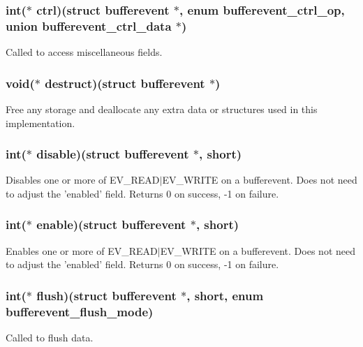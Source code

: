 \subsubsection[{ctrl}]{\setlength{\rightskip}{0pt plus 5cm}int($\ast$ {\bf ctrl})(struct {\bf bufferevent} $\ast$, enum bufferevent\-\_\-ctrl\-\_\-op, union {\bf bufferevent\-\_\-ctrl\-\_\-data} $\ast$)}\label{structbufferevent__ops_a137be51602bbde05eab1b5753e7bb727}
\-Called to access miscellaneous fields. 
\subsubsection[{destruct}]{\setlength{\rightskip}{0pt plus 5cm}void($\ast$ {\bf destruct})(struct {\bf bufferevent} $\ast$)}\label{structbufferevent__ops_a840fc11c5403abdfb2459c85d300c210}
\-Free any storage and deallocate any extra data or structures used in this implementation. 
\subsubsection[{disable}]{\setlength{\rightskip}{0pt plus 5cm}int($\ast$ {\bf disable})(struct {\bf bufferevent} $\ast$, short)}\label{structbufferevent__ops_a03f52d6bf34755e85157ebb5b80dddd3}
\-Disables one or more of \-E\-V\-\_\-\-R\-E\-A\-D$|$\-E\-V\-\_\-\-W\-R\-I\-T\-E on a bufferevent. \-Does not need to adjust the 'enabled' field. \-Returns 0 on success, -\/1 on failure. 
\subsubsection[{enable}]{\setlength{\rightskip}{0pt plus 5cm}int($\ast$ {\bf enable})(struct {\bf bufferevent} $\ast$, short)}\label{structbufferevent__ops_aa7659c0c6097a0d4bd0275080e09787a}
\-Enables one or more of \-E\-V\-\_\-\-R\-E\-A\-D$|$\-E\-V\-\_\-\-W\-R\-I\-T\-E on a bufferevent. \-Does not need to adjust the 'enabled' field. \-Returns 0 on success, -\/1 on failure. 
\subsubsection[{flush}]{\setlength{\rightskip}{0pt plus 5cm}int($\ast$ {\bf flush})(struct {\bf bufferevent} $\ast$, short, enum {\bf bufferevent\-\_\-flush\-\_\-mode})}\label{structbufferevent__ops_a218ce613641e37232fe15ee223a3a155}
\-Called to flush data. 
